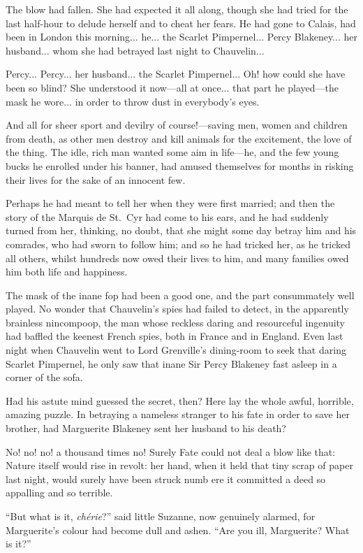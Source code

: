 \documentclass[paper=a5,BCOR=7mm,twoside,DIV=calc,12pt,usegeometry,chapterprefix,endperiod,headings=big]{scrbook}
\begin{document}
The blow had fallen. She had expected it all along, though she had tried for the last half-hour to delude herself and to cheat her fears. He had gone to Calais, had been in London this morning... he... the Scarlet Pimpernel... Percy Blakeney... her husband... whom she had betrayed last night to Chauvelin...

Percy... Percy... her husband... the Scarlet Pimpernel... Oh! how could she have been so blind? She understood it now---all at once... that part he played---the mask he wore... in order to throw dust in everybody's eyes.

And all for sheer sport and devilry of course!---saving men, women and children from death, as other men destroy and kill animals for the excitement, the love of the thing. The idle, rich man wanted some aim in life---he, and the few young bucks he enrolled under his banner, had amused themselves for months in risking their lives for the sake of an innocent few.

Perhaps he had meant to tell her when they were first married; and then the story of the Marquis de St.~Cyr had come to his ears, and he had suddenly turned from her, thinking, no doubt, that she might some day betray him and his comrades, who had sworn to follow him; and so he had tricked her, as he tricked all others, whilst hundreds now owed their lives to him, and many families owed him both life and happiness.

The mask of the inane fop had been a good one, and the part consummately well played. No wonder that Chauvelin's spies had failed to detect, in the apparently brainless nincompoop, the man whose reckless daring and resourceful ingenuity had baffled the keenest French spies, both in France and in England. Even last night when Chauvelin went to Lord Grenville's dining-room to seek that daring Scarlet Pimpernel, he only saw that inane Sir Percy Blakeney fast asleep in a corner of the sofa.

Had his astute mind guessed the secret, then? Here lay the whole awful, horrible, amazing puzzle. In betraying a nameless stranger to his fate in order to save her brother, had Marguerite Blakeney sent her husband to his death?

No! no! no! a thousand times no! Surely Fate could not deal a blow like that: Nature itself would rise in revolt: her hand, when it held that tiny scrap of paper last night, would surely have been struck numb ere it committed a deed so appalling and so terrible.

\enquote{But what is it, \textit{chérie}?} said little Suzanne, now genuinely alarmed, for Marguerite's colour had become dull and ashen. \enquote{Are you ill, Marguerite? What is it?}
\end{document}
